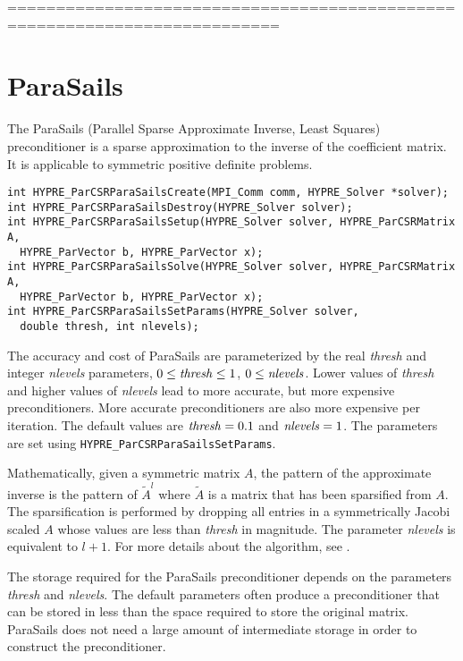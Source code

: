 ==========================================================================
\section{ParaSails}

The ParaSails (Parallel Sparse Approximate Inverse, Least Squares) 
preconditioner is a sparse approximation to the inverse of the 
coefficient matrix.  It is applicable to symmetric positive definite
problems.  

\begin{display}
\begin{verbatim}
int HYPRE_ParCSRParaSailsCreate(MPI_Comm comm, HYPRE_Solver *solver);
int HYPRE_ParCSRParaSailsDestroy(HYPRE_Solver solver);
int HYPRE_ParCSRParaSailsSetup(HYPRE_Solver solver, HYPRE_ParCSRMatrix A,
  HYPRE_ParVector b, HYPRE_ParVector x);
int HYPRE_ParCSRParaSailsSolve(HYPRE_Solver solver, HYPRE_ParCSRMatrix A,
  HYPRE_ParVector b, HYPRE_ParVector x);
int HYPRE_ParCSRParaSailsSetParams(HYPRE_Solver solver, 
  double thresh, int nlevels);
\end{verbatim}
\end{display}

The accuracy and cost of ParaSails are parameterized by the real {\em thresh}
and integer {\em nlevels} parameters, 
$0 \le {\it thresh} \le 1$, $0 \le {\it nlevels}$.  
Lower values of {\em thresh}
and higher values of {\em nlevels} lead to more accurate, but more expensive
preconditioners.  More accurate preconditioners are also more expensive
per iteration.  The default values are ${\it thresh} = 0.1$
and ${\it nlevels} = 1$.  The parameters are set using 
{\tt HYPRE\_ParCSRParaSailsSetParams}.

Mathematically, given a symmetric matrix $A$, the pattern of the 
approximate inverse is the pattern of $\tilde{A}^l$ where $\tilde{A}$
is a matrix that has been sparsified from $A$.  The sparsification 
is performed by dropping all entries in a symmetrically Jacobi scaled $A$
whose values are less than {\em thresh} in magnitude.  The parameter
{\em nlevels} is equivalent to $l+1$.
For more details about the algorithm, see \cite{Chow:1999:APS}.

The storage required for the ParaSails preconditioner depends on 
the parameters {\em thresh} and {\em nlevels}.  The default parameters
often produce a preconditioner that can be stored in less than the 
space required to store the original matrix.
ParaSails does not need a large amount of intermediate storage in 
order to construct the preconditioner.

